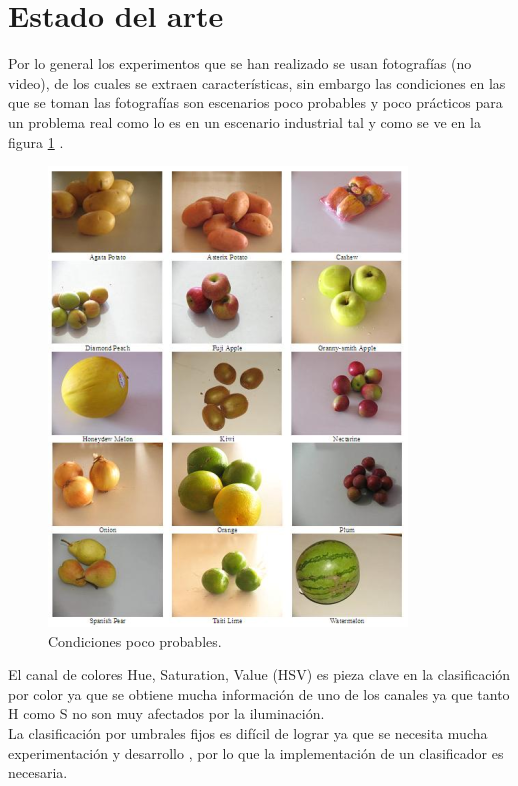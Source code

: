 \documentclass[twoside,spanish,ESP,MSc]{plantillaLabUPV}
\theoremstyle{definition}
\begin{document}
\section{Estado del arte}
Por lo general los experimentos que se han realizado se usan fotografías (no video), de los cuales se extraen características, sin embargo las condiciones en las que se toman las fotografías son escenarios poco probables y poco prácticos para un problema real como lo es en un escenario industrial tal y como se ve en la figura \ref{chafa} \cite{chafafrut}.\\

 \begin{figure}[h]
\centering
\includegraphics*[scale=0.5]{datchafa} 
\caption{Condiciones poco probables.}
\label{chafa}
\end{figure}

El canal de colores Hue, Saturation, Value (HSV) es pieza clave en la clasificación por color \cite{analis,chokun,rgbhisto,huehue} ya que se obtiene mucha información de uno de los canales ya que tanto H como S no son muy afectados por la iluminación.\\

La clasificación por umbrales fijos es difícil de lograr ya que se necesita mucha experimentación y desarrollo \cite{huehue,josu}, por lo que la implementación de un clasificador es necesaria.\\
\end{document}
